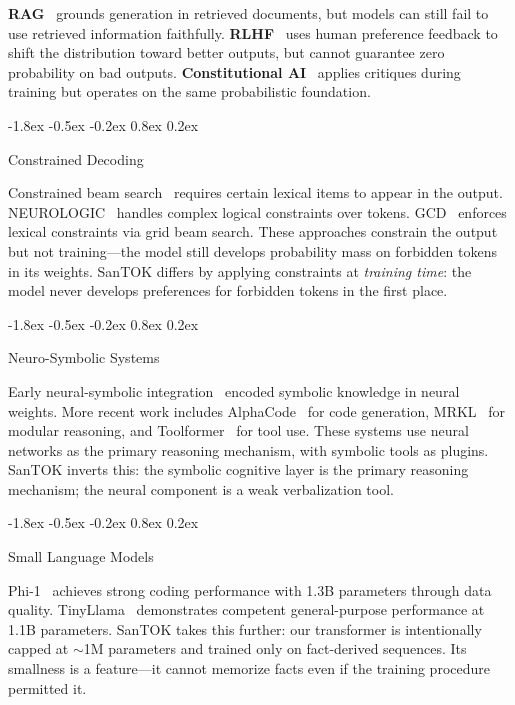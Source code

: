 \documentclass[10pt]{article}
\makeatletter
\renewcommand{\subsection}{\@startsection{subsection}{2}{\z@}%
  {-1.8ex \@plus -0.5ex \@minus -0.2ex}%
  {0.8ex \@plus 0.2ex}%
  {\normalsize\bfseries\raggedright}}
\makeatother
\begin{document}
\textbf{RAG}~\cite{lewis2020rag} grounds generation in retrieved documents, but models
can still fail to use retrieved information faithfully.
\textbf{RLHF}~\cite{ouyang2022training} uses human preference feedback to shift the
distribution toward better outputs, but cannot guarantee zero probability on bad
outputs.
\textbf{Constitutional AI}~\cite{bai2022constitutional} applies critiques during
training but operates on the same probabilistic foundation.

\subsection{Constrained Decoding}

Constrained beam search~\cite{anderson2017bottomup} requires certain lexical items to
appear in the output. NEUROLOGIC~\cite{lu2021neurologic} handles complex logical
constraints over tokens. GCD~\cite{hokamp2017grid} enforces lexical constraints via
grid beam search. These approaches constrain the output but not training---the model
still develops probability mass on forbidden tokens in its weights. SanTOK differs by
applying constraints at \emph{training time}: the model never develops preferences for
forbidden tokens in the first place.

\subsection{Neuro-Symbolic Systems}

Early neural-symbolic integration~\cite{garcez2002neural} encoded symbolic knowledge
in neural weights. More recent work includes AlphaCode~\cite{li2022alphacode} for code
generation, MRKL~\cite{karpas2022mrkl} for modular reasoning, and
Toolformer~\cite{schick2023toolformer} for tool use. These systems use neural networks
as the primary reasoning mechanism, with symbolic tools as plugins. SanTOK inverts
this: the symbolic cognitive layer is the primary reasoning mechanism; the neural
component is a weak verbalization tool.

\subsection{Small Language Models}

Phi-1~\cite{gunasekar2023textbooks} achieves strong coding performance with 1.3B
parameters through data quality. TinyLlama~\cite{zhang2024tinyllama} demonstrates
competent general-purpose performance at 1.1B parameters. SanTOK takes this further:
our transformer is intentionally capped at $\sim$1M parameters and trained only on
fact-derived sequences. Its smallness is a feature---it cannot memorize facts even if
the training procedure permitted it.
\end{document}
